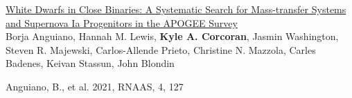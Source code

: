 \documentclass[letterpaper,12pt]{article}
\begin{document}
\vspace{3mm}
\noindent{}
\begin{etaremune}
\item \href{https://iopscience.iop.org/article/10.3847/2515-5172/abac04}{\textcolor{rotundaorange}{White Dwarfs in Close Binaries: A Systematic Search for Mass-transfer Systems and Supernova Ia Progenitors in the APOGEE Survey}}\\
Borja Anguiano, Hannah M. Lewis, \textbf{Kyle A. Corcoran}, Jasmin Washington, Steven R. Majewski, Carlos-Allende Prieto, Christine N. Mazzola, Carles Badenes, Keivan Stassun, John Blondin

Anguiano, B., et al. 2021, RNAAS, 4, 127
\end{etaremune}
\end{document}
